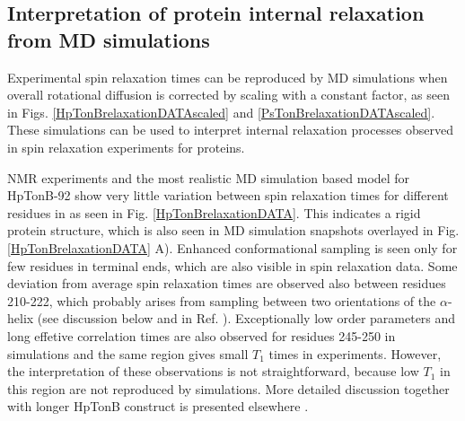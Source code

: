 \documentclass[pre,aps,floatfix,authordate1-4,twocolumn]{revtex4-1}
\begin{document}
\subsection{Interpretation of protein internal relaxation from MD simulations}
Experimental spin relaxation times can be reproduced by MD simulations
when overall rotational diffusion is corrected by scaling with a constant factor,
as seen in Figs. \ref{HpTonBrelaxationDATAscaled} and \ref{PsTonBrelaxationDATAscaled}.
These simulations can be used to interpret internal relaxation processes
observed in spin relaxation experiments for proteins.

NMR experiments and the most realistic MD simulation based model for HpTonB-92
show very little variation between spin relaxation times for
different residues in  as seen in Fig. \ref{HpTonBrelaxationDATA}.
This indicates a rigid protein structure, which is also seen in
MD simulation snapshots overlayed in Fig. \ref{HpTonBrelaxationDATA} A).
Enhanced conformational sampling is seen only for few residues in terminal
ends, which are also visible in spin relaxation data.
Some deviation from average spin relaxation times are observed also
between residues 210-222, which probably arises from sampling between
two orientations of the $\alpha$-helix (see discussion below and in Ref. \cite{??}).
Exceptionally low order parameters and long effetive correlation times
are also observed for residues 245-250 in simulations and the same region
gives small $T_1$ times in experiments. However, the interpretation of
these observations is not straightforward, because low $T_1$ in this region
are not reproduced by simulations. More detailed discussion together with
longer HpTonB construct is presented elsewhere \cite{??}.
\end{document}
